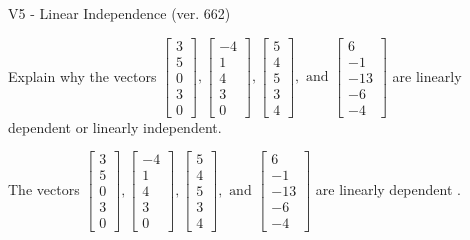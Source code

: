 \begin{exercise}
  \begin{exerciseTitle}V5 - Linear Independence (ver. 662)\end{exerciseTitle}
  \begin{exerciseStatement}
    Explain why the vectors \(\left[\begin{array}{r}
3 \\
5 \\
0 \\
3 \\
0
\end{array}\right] , \left[\begin{array}{r}
-4 \\
1 \\
4 \\
3 \\
0
\end{array}\right] , \left[\begin{array}{r}
5 \\
4 \\
5 \\
3 \\
4
\end{array}\right] , \text{ and } \left[\begin{array}{r}
6 \\
-1 \\
-13 \\
-6 \\
-4
\end{array}\right]\) are linearly dependent or linearly independent.	


  \end{exerciseStatement}
  \begin{exerciseAnswer}
   The vectors \(\left[\begin{array}{r}
3 \\
5 \\
0 \\
3 \\
0
\end{array}\right] , \left[\begin{array}{r}
-4 \\
1 \\
4 \\
3 \\
0
\end{array}\right] , \left[\begin{array}{r}
5 \\
4 \\
5 \\
3 \\
4
\end{array}\right] , \text{ and } \left[\begin{array}{r}
6 \\
-1 \\
-13 \\
-6 \\
-4
\end{array}\right]\) are 
  	 linearly dependent  .
  


  \end{exerciseAnswer}
\end{exercise}